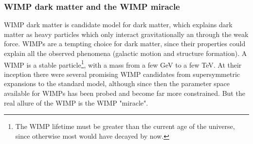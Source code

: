 \subsubsection{WIMP dark matter and the WIMP miracle}\label{sec:IntroWIMPs}
WIMP dark matter is candidate model for dark matter, which explains dark matter as heavy particles which only interact gravitationally an through the weak force. WIMPs are a tempting choice for dark matter, since their properties could explain all the observed phenomena (galactic motion and structure formation). A WIMP is a stable particle\footnote{The WIMP lifetime must be greater than the current age of the universe, since otherwise most would have decayed by now.}, with a mass from a few GeV to a few TeV. At their inception there were several promising WIMP candidates from supersymmetric expansions to the standard model, although since then the parameter space available for WIMPs has been probed and become far more constrained. But the real allure of the WIMP is the WIMP "miracle". \\

